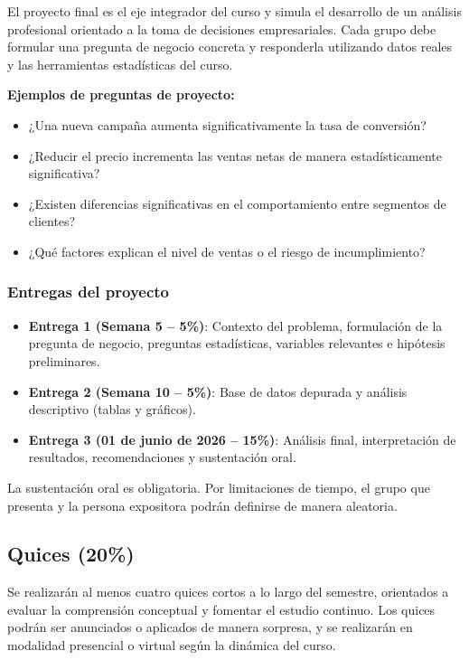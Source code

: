 \documentclass[
  11pt,
]{article}
\providecommand{\tightlist}{%
  \setlength{\itemsep}{0pt}\setlength{\parskip}{0pt}}
\begin{document}
El proyecto final es el eje integrador del curso y simula el desarrollo
de un análisis profesional orientado a la toma de decisiones
empresariales. Cada grupo debe formular una pregunta de negocio concreta
y responderla utilizando datos reales y las herramientas estadísticas
del curso.

\textbf{Ejemplos de preguntas de proyecto:}

\begin{itemize}
\tightlist
\item
  ¿Una nueva campaña aumenta significativamente la tasa de conversión?
\item
  ¿Reducir el precio incrementa las ventas netas de manera
  estadísticamente significativa?
\item
  ¿Existen diferencias significativas en el comportamiento entre
  segmentos de clientes?
\item
  ¿Qué factores explican el nivel de ventas o el riesgo de
  incumplimiento?
\end{itemize}

\hypertarget{entregas-del-proyecto}{%
\subsubsection{Entregas del proyecto}\label{entregas-del-proyecto}}

\begin{itemize}
\tightlist
\item
  \textbf{Entrega 1 (Semana 5 -- 5\%)}: Contexto del problema,
  formulación de la pregunta de negocio, preguntas estadísticas,
  variables relevantes e hipótesis preliminares.
\item
  \textbf{Entrega 2 (Semana 10 -- 5\%)}: Base de datos depurada y
  análisis descriptivo (tablas y gráficos).
\item
  \textbf{Entrega 3 (01 de junio de 2026 -- 15\%)}: Análisis final,
  interpretación de resultados, recomendaciones y sustentación oral.
\end{itemize}

La sustentación oral es obligatoria. Por limitaciones de tiempo, el
grupo que presenta y la persona expositora podrán definirse de manera
aleatoria.

\hypertarget{quices-20}{%
\subsection{Quices (20\%)}\label{quices-20}}

Se realizarán al menos cuatro quices cortos a lo largo del semestre,
orientados a evaluar la comprensión conceptual y fomentar el estudio
continuo. Los quices podrán ser anunciados o aplicados de manera
sorpresa, y se realizarán en modalidad presencial o virtual según la
dinámica del curso.
\end{document}
